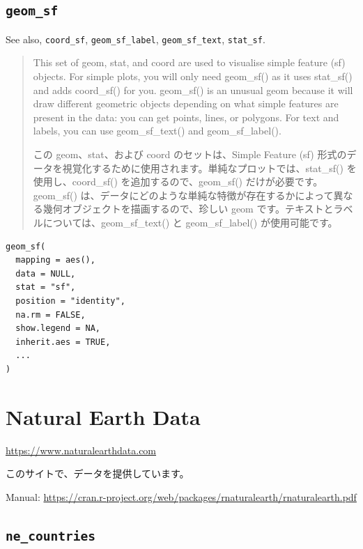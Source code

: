 \documentclass[
  xelatex, ja=standard]{bxjsbook}
\theoremstyle{definition}
\theoremstyle{definition}
\theoremstyle{definition}
\theoremstyle{definition}
\theoremstyle{remark}
\begin{document}
\hypertarget{geom_sf}{%
\subsection{\texorpdfstring{\texttt{geom\_sf}}{geom\_sf}}\label{geom_sf}}

See also, \texttt{coord\_sf}, \texttt{geom\_sf\_label}, \texttt{geom\_sf\_text}, \texttt{stat\_sf}.

\begin{quote}
This set of geom, stat, and coord are used to visualise simple feature (sf) objects. For simple plots, you will only need geom\_sf() as it uses stat\_sf() and adds coord\_sf() for you. geom\_sf() is an unusual geom because it will draw different geometric objects depending on what simple features are present in the data: you can get points, lines, or polygons. For text and labels, you can use geom\_sf\_text() and geom\_sf\_label().

この geom、stat、および coord のセットは、Simple Feature (sf) 形式のデータを視覚化するために使用されます。単純なプロットでは、stat\_sf() を使用し、coord\_sf() を追加するので、geom\_sf() だけが必要です。geom\_sf() は、データにどのような単純な特徴が存在するかによって異なる幾何オブジェクトを描画するので、珍しい geom です。テキストとラベルについては、geom\_sf\_text() と geom\_sf\_label() が使用可能です。
\end{quote}

\begin{verbatim}
geom_sf(
  mapping = aes(),
  data = NULL,
  stat = "sf",
  position = "identity",
  na.rm = FALSE,
  show.legend = NA,
  inherit.aes = TRUE,
  ...
)
\end{verbatim}

\hypertarget{natural-earth-data}{%
\section{Natural Earth Data}\label{natural-earth-data}}

\url{https://www.naturalearthdata.com}

このサイトで、データを提供しています。

Manual: \url{https://cran.r-project.org/web/packages/rnaturalearth/rnaturalearth.pdf}

\hypertarget{ne_countries}{%
\subsection{\texorpdfstring{\texttt{ne\_countries}}{ne\_countries}}\label{ne_countries}}
\end{document}
